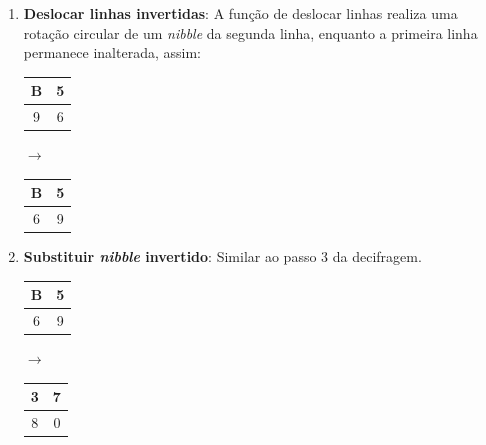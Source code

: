 \documentclass{article}
\begin{document}
\begin{enumerate}
    \item \textbf{Deslocar linhas invertidas}: A função de deslocar linhas
    realiza uma rotação circular de um \textit{nibble} da segunda linha,
    enquanto a primeira linha permanece inalterada, assim:
    \begin{center}
        \begin{tabular}{|c|c|}
            \hline
            B & 5  \\
            \hline
            9 & 6 \\
            \hline
        \end{tabular}
        $\to$
        \begin{tabular}{|c|c|}
            \hline
            B & 5  \\
            \hline
            6 & 9 \\
            \hline
        \end{tabular}
    \end{center}
    
    \item \textbf{Substituir \textit{nibble} invertido}: Similar ao passo 3 da
    decifragem.
    \begin{center}
        \begin{tabular}{|c|c|}
            \hline
            B & 5  \\
            \hline
            6 & 9 \\
            \hline
        \end{tabular}
        $\to$
        \begin{tabular}{|c|c|}
            \hline
            3 & 7  \\
            \hline
            8 & 0 \\
            \hline
        \end{tabular}
    \end{center}
    

\end{enumerate}
\end{document}
